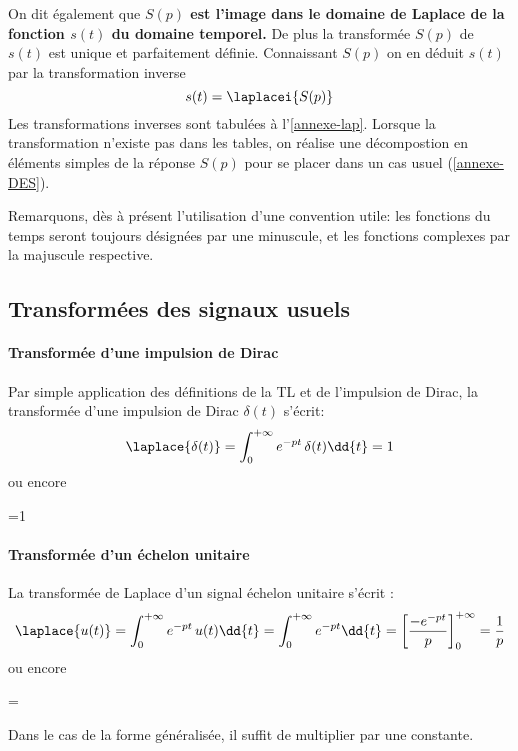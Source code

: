 On dit également que \textbf{$S(p)$ est l'image dans le domaine de 
Laplace de la fonction $s(t)$ du domaine temporel.}
De plus la transformée $S(p)$ de $s(t)$ est unique et parfaitement définie. 
Connaissant $S(p)$ on en déduit $s(t)$
par la transformation inverse 
$$
s(t)=\laplacei{S(p)}
$$
Les transformations inverses sont tabulées à l'\cref{annexe-lap}. 
Lorsque la transformation
n'existe pas dans les tables, on réalise une décompostion en éléments 
simples de la réponse 
$S(p)$ pour se placer dans un cas usuel (\cref{annexe-DES}).

Remarquons, dès à présent l'utilisation d'une convention utile: 
les fonctions du temps seront toujours désignées par une
minuscule, et les fonctions complexes par la majuscule respective.

\subsection{Transformées des signaux usuels}

\paragraph{Transformée d'une impulsion de Dirac}
Par simple application des définitions 
de la TL et de l'impulsion de Dirac, la transformée d'une 
impulsion de Dirac $\delta(t)$ s'écrit:
$$
\laplace{\delta(t)}=\int_{0}^{+\infty} e^{-pt}\,\delta(t)\dd{t}=1
$$
ou encore
\begin{bequation}
    =1
\end{bequation}

\paragraph{Transformée d'un échelon unitaire}
La transformée de Laplace d'un signal échelon unitaire s'écrit : 
$$
\laplace{u(t)}=\int_{0}^{+\infty} e^{-pt}\,u(t)\dd{t}=\int_{0}^{+\infty} e^{-pt}\dd{t}=\left[\dfrac{-e^{-pt}}{p}\right]_0^{+\infty}=\dfrac{1}{p}
$$
ou encore
\begin{bequation}
    =
\end{bequation}
Dans le cas de la forme généralisée, il suffit de multiplier par une constante.

